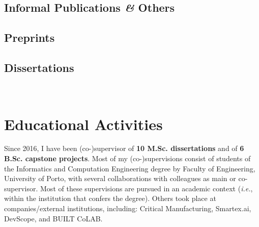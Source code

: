\documentclass[10pt, a4paper]{article}
\newcommand{\FEUP}{Faculty of Engineering, University of Porto}
\newcommand{\years}[1]{\marginnote{\raggedleft\footnotesize #1}}
\begin{document}
\subsection*{Informal Publications \textit{\&} Others}

\begin{etaremune}
	\renewcommand\labelenumi{\footnotesize\theenumi .}
	\item {}
	\item {}
	\item {}
	\item {}
\end{etaremune}

\subsection*{Preprints}

\begin{etaremune}
	\renewcommand\labelenumi{\footnotesize\theenumi .}
	\item  {}
\end{etaremune}


\subsection*{Dissertations}


\years{2022} 
\\[0.42em]
\years{2016} 




\section*{Educational Activities}

Since 2016, I have been (co-)supervisor of \textbf{10 M.Sc. dissertations} and of \textbf{6 B.Sc. capstone projects}. Most of my (co-)supervisions consist of students of the Informatics and Computation Engineering degree by \FEUP, with several collaborations with colleagues as main or co-supervisor. Most of these supervisions are pursued in an academic context (\textit{i.e.}, within the institution that confers the degree). Others took place at companies/external institutions, including: Critical Manufacturing, Smartex.ai, DevScope, and BUILT CoLAB.
\end{document}
